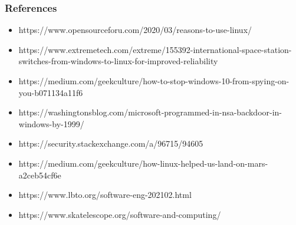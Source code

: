 \documentclass{beamer}
\begin{document}
\begin{frame}
\frametitle{References}
\begin{itemize}
    \item https://www.opensourceforu.com/2020/03/reasons-to-use-linux/
    \item https://www.extremetech.com/extreme/155392-international-space-station-switches-from-windows-to-linux-for-improved-reliability
    \item https://medium.com/geekculture/how-to-stop-windows-10-from-spying-on-you-b071134a11f6
    \item https://washingtonsblog.com/microsoft-programmed-in-nsa-backdoor-in-windows-by-1999/
    \item https://security.stackexchange.com/a/96715/94605
    \item https://medium.com/geekculture/how-linux-helped-us-land-on-mars-a2ceb54cf6e
    \item https://www.lbto.org/software-eng-202102.html
    \item https://www.skatelescope.org/software-and-computing/
\end{itemize}
\end{frame}


\end{document}
